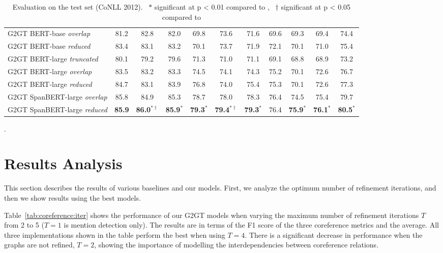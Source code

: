 \documentclass[11pt]{article}
\begin{document}
\begin{table*}[t]
\begin{adjustbox}{width=1\textwidth}
\begin{tabular}{l c c c | c c c | c c c | c }
			G2GT BERT-base \emph{overlap} & 81.2 & 82.8 & 82.0 & 69.8 & 73.6 & 71.6 & 69.6 & 69.3 & 69.4 & 74.4 \\
			G2GT BERT-base \emph{reduced} & 83.4 & 83.1 & 83.2 & 70.1 & 73.7 & 71.9 & 72.1 & 70.1 & 71.0 & 75.4 \\ 
			G2GT BERT-large \emph{truncated} & 80.1 & 79.2 & 79.6 & 71.3 & 71.0 & 71.1 & 69.1 & 68.8 & 68.9 & 73.2 \\
			G2GT BERT-large \emph{overlap} & 83.5 & 83.2 & 83.3 & 74.5 & 74.1 & 74.3 & 75.2 & 70.1 & 72.6 & 76.7 \\
			G2GT BERT-large \emph{reduced} & 84.7 & 83.1 & 83.9 & 76.8 & 74.0 & 75.4 & 75.3 & 70.1 & 72.6 & 77.3 \\
			G2GT SpanBERT-large \emph{overlap} & 85.8 & 84.9 &85.3 & 78.7 &	78.0& 78.3 & 76.4 & 74.5 & 75.4 & 79.7 \\
			G2GT SpanBERT-large \emph{reduced} & \textbf{85.9}	&\textbf{86.0}$^{*\dagger}$&	\textbf{85.9}$^{*}$&	\textbf{79.3}$^{*}$&	\textbf{79.4}$^{*\dagger}$&	\textbf{79.3}$^{*}$&	76.4&	\textbf{75.9}$^{*}$&	\textbf{76.1}$^{*}$&	\textbf{80.5}$^{*}$ \\ 
			\bottomrule 
		\end{tabular} 
	\end{adjustbox}  
	\caption{Evaluation on the test set (CoNLL 2012).~  $*$ significant at p < 0.01 compared to \citep{joshi-etal-2020-spanbert},~ $\dagger$ significant at p < 0.05 compared to \citep{xu-choi-2020-revealing}}.
	\label{tab:coreference:results}
	
\end{table*}


\section{Results Analysis} 
\label{sec:coreference:results}
This section describes the results of various baselines and our models. 
First, we analyze the optimum number of refinement iterations, and then we show results using the best models.

Table~\ref{tab:coreference:iter} shows the performance of our G2GT models when varying the maximum number of refinement iterations $T$ from 2 to 5 ($T{=}1$ is mention detection only). The results are in terms of the F1 score of the three coreference metrics and the average. All three implementations shown in the table perform the best when using $T{=}4$. There is a significant decrease in performance when the graphs are not refined, $T{=}2$, showing the importance of modelling the interdependencies between coreference relations. 
\end{document}
